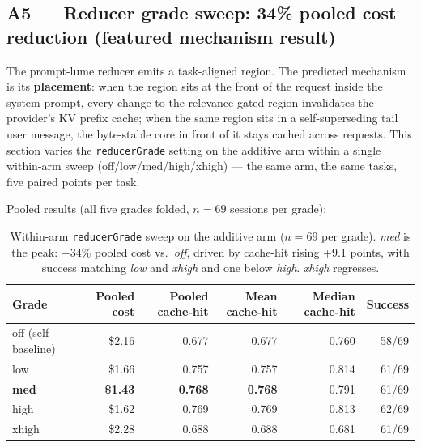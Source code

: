 \documentclass[11pt]{article}
\begin{document}
\subsection{A5 --- Reducer grade sweep: 34\% pooled cost reduction (featured mechanism result)}
\label{sec:sweep}

The prompt-lume reducer emits a task-aligned region. The predicted mechanism is its \textbf{placement}: when the region sits at the front of the request inside the system prompt, every change to the relevance-gated region invalidates the provider's KV prefix cache; when the same region sits in a self-superseding tail user message, the byte-stable core in front of it stays cached across requests. This section varies the \texttt{reducerGrade} setting on the additive arm within a single within-arm sweep (off/low/med/high/xhigh) --- the same arm, the same tasks, five paired points per task.

Pooled results (all five grades folded, $n = 69$ sessions per grade):

\begin{table}[h]
\centering
\begin{tabular}{@{}lrrrrr@{}}
\toprule
Grade & Pooled cost & Pooled cache-hit & Mean cache-hit & Median cache-hit & Success \\
\midrule
off (self-baseline) & \$2.16 & 0.677 & 0.677 & 0.760 & 58/69 \\
low & \$1.66 & 0.757 & 0.757 & 0.814 & 61/69 \\
\textbf{med} & \textbf{\$1.43} & \textbf{0.768} & \textbf{0.768} & 0.791 & 61/69 \\
high & \$1.62 & 0.769 & 0.769 & 0.813 & 62/69 \\
xhigh & \$2.28 & 0.688 & 0.688 & 0.681 & 61/69 \\
\bottomrule
\end{tabular}
\caption{Within-arm \texttt{reducerGrade} sweep on the additive arm ($n = 69$ per grade). \emph{med} is the peak: $-34\%$ pooled cost vs.\ \emph{off}, driven by cache-hit rising +9.1 points, with success matching \emph{low} and \emph{xhigh} and one below \emph{high}. \emph{xhigh} regresses.}
\label{tab:sweep}
\end{table}
\end{document}
